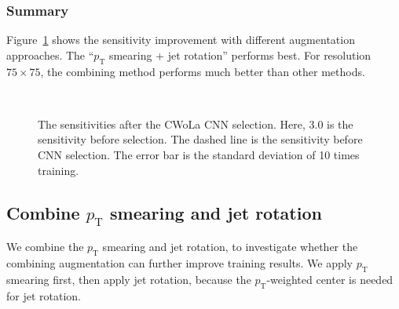 \documentclass[12pt]{article}
\begin{document}
        \subsubsection{Summary}%
        \label{subs:summary}
            Figure~\ref{fig:sensitivity_improvement_summary_aug_SB_3} shows the sensitivity improvement with different augmentation approaches. The ``$p_{\text{T}}$ smearing + jet rotation'' performs best. For resolution $75\times 75$, the combining method performs much better than other methods.
            \begin{figure}[htpb]
                \centering
                 \\
                \caption{The sensitivities after the CWoLa CNN selection. Here, $3.0$ is the sensitivity before selection. The dashed line is the sensitivity before CNN selection. The error bar is the standard deviation of 10 times training.}
                \label{fig:sensitivity_improvement_summary_aug_SB_3}
            \end{figure}
    \subsection{Combine \texorpdfstring{$p_{\mathrm{T}}$}{pT} smearing and jet rotation}%
    \label{sub:combine_pt_smearing_and_jet_rotation}
        We combine the $p_{\text{T}}$ smearing and jet rotation, to investigate whether the combining augmentation can further improve training results. We apply $p_{\text{T}}$ smearing first, then apply jet rotation, because the $p_{\text{T}}$-weighted center is needed for jet rotation.
\end{document}
